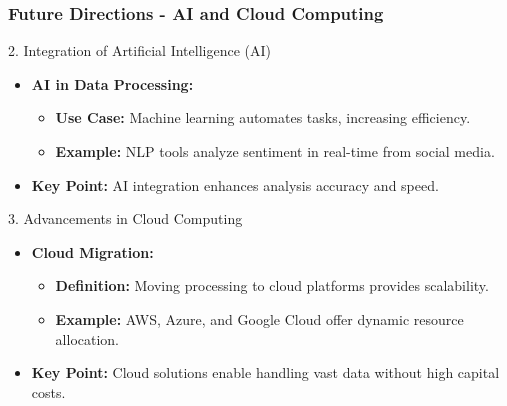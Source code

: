\documentclass[aspectratio=169]{beamer}
\begin{document}
\begin{frame}[fragile]
    \frametitle{Future Directions - AI and Cloud Computing}
    \begin{block}{2. Integration of Artificial Intelligence (AI)}
        \begin{itemize}
            \item \textbf{AI in Data Processing:}
                \begin{itemize}
                    \item \textbf{Use Case:} Machine learning automates tasks, increasing efficiency.
                    \item \textbf{Example:} NLP tools analyze sentiment in real-time from social media.
                \end{itemize}
            \item \textbf{Key Point:} AI integration enhances analysis accuracy and speed.
        \end{itemize}
    \end{block}

    \begin{block}{3. Advancements in Cloud Computing}
        \begin{itemize}
            \item \textbf{Cloud Migration:}
                \begin{itemize}
                    \item \textbf{Definition:} Moving processing to cloud platforms provides scalability.
                    \item \textbf{Example:} AWS, Azure, and Google Cloud offer dynamic resource allocation.
                \end{itemize}
            \item \textbf{Key Point:} Cloud solutions enable handling vast data without high capital costs.
        \end{itemize}
    \end{block}
\end{frame}
\end{document}
